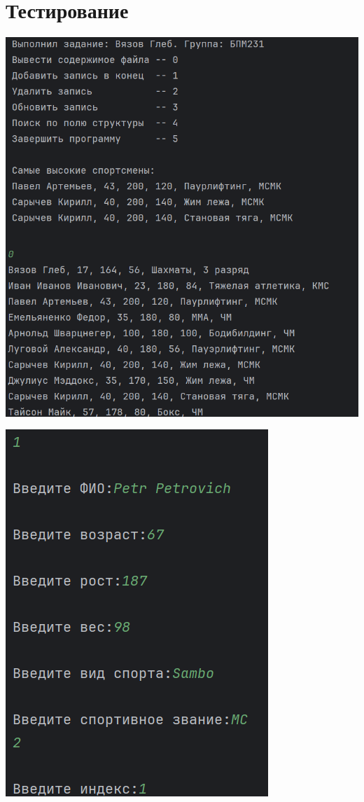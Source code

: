 \documentclass[12pt]{article}
\begin{document}
\newpage


\section*{Тестирование}


\includegraphics[scale=0.8]{img1}

\includegraphics[scale=0.8]{img2}
\end{document}
